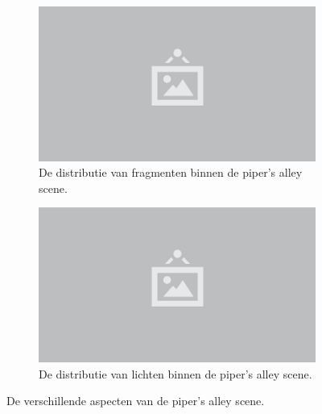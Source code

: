 \begin{figure}[p]
\begin{subfigure}[b]{.33\linewidth}
  \end{subfigure}%
  \begin{subfigure}[b]{.33\linewidth}
    \centering\includegraphics[width=\textwidth]{./img/raw/placeholder.png}
    \caption{De distributie van fragmenten binnen de piper's alley scene.}\label{fig:test-suite-pipers-alley:fragments}
  \end{subfigure}%
  \begin{subfigure}[b]{.33\linewidth}
    \centering\includegraphics[width=\textwidth]{./img/raw/placeholder.png}
    \caption{De distributie van lichten binnen de piper's alley scene.}\label{fig:test-suite-pipers-alley:lights}
  \end{subfigure}%
  \caption{De verschillende aspecten van de piper's alley scene.}
  \label{fig:test-suite-pipers-alley-images}
\end{figure}
